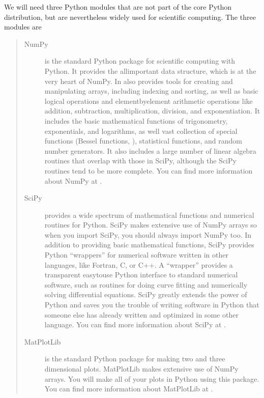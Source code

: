 \documentclass[letterpaper,10pt,english]{sphinxmanual}
\begin{document}
\sphinxAtStartPar
We will need three Python modules that are not part of the core Python distribution, but are nevertheless widely used for scientific computing.  The three modules are
\begin{quote}
\begin{description}
\item[{NumPy}] \leavevmode
\sphinxAtStartPar
is the standard Python package for scientific computing with Python.  It provides the all\sphinxhyphen{}important  data structure, which is at the very heart of NumPy.  In also provides tools for creating and manipulating arrays, including indexing and sorting, as well as basic logical operations and element\sphinxhyphen{}by\sphinxhyphen{}element arithmetic operations like addition, subtraction, multiplication, division, and exponentiation.  It includes the basic mathematical functions of trigonometry, exponentials, and logarithms, as well vast collection of special functions (Bessel functions, ), statistical functions, and random number generators.  It also includes a large number of linear algebra routines that overlap with those in SciPy, although the SciPy routines tend to be more complete.  You can find more information about NumPy at .

\item[{SciPy}] \leavevmode
\sphinxAtStartPar
provides a wide spectrum of mathematical functions and numerical routines for Python.  SciPy makes extensive use of NumPy arrays so when you import SciPy, you should always import NumPy too.  In addition to providing basic mathematical functions, SciPy provides Python “wrappers” for numerical software written in other languages, like Fortran, C, or C++.  A  “wrapper” provides a transparent easy\sphinxhyphen{}to\sphinxhyphen{}use Python interface to standard numerical software, such as routines for doing curve fitting and numerically solving differential equations.  SciPy greatly extends the power of Python and saves you the trouble of writing software in Python that someone else has already written and optimized in some other language.  You can find more information about SciPy at .

\item[{MatPlotLib}] \leavevmode
\sphinxAtStartPar
is the standard Python package for making two and three dimensional plots.  MatPlotLib makes extensive use of NumPy arrays.  You will make all of your plots in Python using this package.  You can find more information about MatPlotLib at .

\end{description}
\end{quote}
\end{document}
